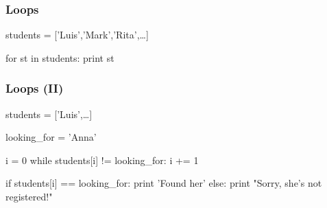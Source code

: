 \begin{frame}[fragile]
\frametitle{Loops}

\begin{python}
students = ['Luis','Mark','Rita',\ldots]

for st in students:
    print st
\end{python}
\end{frame}

\begin{frame}[fragile]
\frametitle{Loops (II)}

\begin{python}

students = ['Luis',\ldots]

looking_for = 'Anna'

i = 0
while students[i] != looking_for:
    i += 1

if students[i] == looking_for:
    print 'Found her'
else:
    print "Sorry, she's not registered!"
\end{python}

\end{frame}


